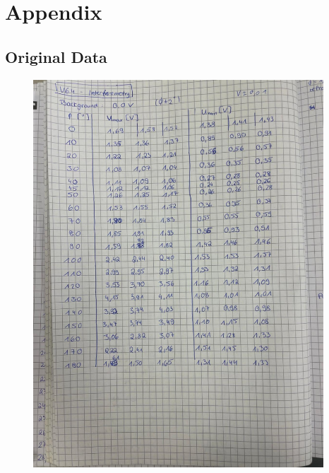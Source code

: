 \section{Appendix}
\label{sec:Appendix}
\subsection{Original Data}
\begin{figure}[H]
  \centering
  \includegraphics[width=0.97\textwidth]{Messdaten/1.pdf}
  \label{fig:Messdaten1}
\end{figure}
